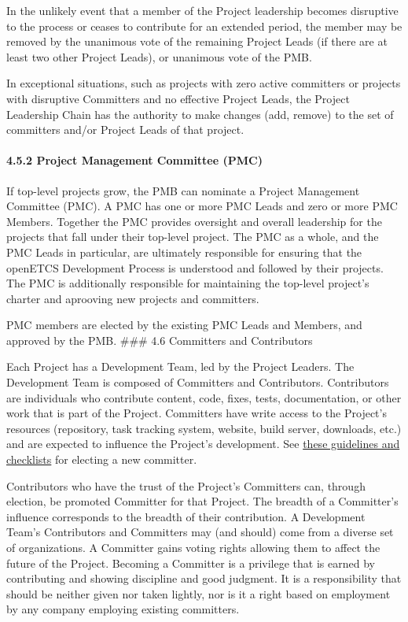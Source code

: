 In the unlikely event that a member of the Project leadership becomes
disruptive to the process or ceases to contribute for an extended
period, the member may be removed by the unanimous vote of the remaining
Project Leads (if there are at least two other Project Leads), or
unanimous vote of the PMB.

In exceptional situations, such as projects with zero active committers
or projects with disruptive Committers and no effective Project Leads,
the Project Leadership Chain has the authority to make changes (add,
remove) to the set of committers and/or Project Leads of that project.

\paragraph{4.5.2 Project Management Committee
(PMC)}\label{project-management-committee-pmc}

If top-level projects grow, the PMB can nominate a Project Management
Committee (PMC). A PMC has one or more PMC Leads and zero or more PMC
Members. Together the PMC provides oversight and overall leadership for
the projects that fall under their top-level project. The PMC as a
whole, and the PMC Leads in particular, are ultimately responsible for
ensuring that the openETCS Development Process is understood and
followed by their projects. The PMC is additionally responsible for
maintaining the top-level project's charter and aprooving new projects
and committers.

PMC members are elected by the existing PMC Leads and Members, and
approved by the PMB. \#\#\# 4.6 Committers and Contributors

Each Project has a Development Team, led by the Project Leaders. The
Development Team is composed of Committers and Contributors.
Contributors are individuals who contribute content, code, fixes, tests,
documentation, or other work that is part of the Project. Committers
have write access to the Project's resources (repository, task tracking
system, website, build server, downloads, etc.) and are expected to
influence the Project's development. See
\href{Committer-Guidelines}{these guidelines and checklists} for
electing a new committer.

Contributors who have the trust of the Project's Committers can, through
election, be promoted Committer for that Project. The breadth of a
Committer's influence corresponds to the breadth of their contribution.
A Development Team's Contributors and Committers may (and should) come
from a diverse set of organizations. A Committer gains voting rights
allowing them to affect the future of the Project. Becoming a Committer
is a privilege that is earned by contributing and showing discipline and
good judgment. It is a responsibility that should be neither given nor
taken lightly, nor is it a right based on employment by any company
employing existing committers.

